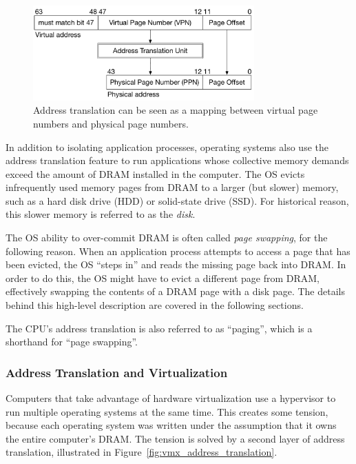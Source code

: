 \begin{figure}[hbt]
  \centering
  \includegraphics[width=85mm]{figures/address_translation_bits.pdf}
  \caption{
    Address translation can be seen as a mapping between virtual page numbers
    and physical page numbers.
  }
  \label{fig:address_translation_bits}
\end{figure}

In addition to isolating application processes, operating systems also use the
address translation feature to run applications whose collective memory
demands exceed the amount of DRAM installed in the computer. The OS evicts
infrequently used memory pages from DRAM to a larger (but slower) memory, such
as a hard disk drive (HDD) or solid-state drive (SSD). For historical reason,
this slower memory is referred to as the \textit{disk}.

The OS ability to over-commit DRAM is often called \textit{page swapping}, for
the following reason. When an application process attempts to access a page
that has been evicted, the OS ``steps in'' and reads the missing page back into
DRAM. In order to do this, the OS might have to evict a different page from
DRAM, effectively swapping the contents of a DRAM page with a disk page. The
details behind this high-level description are covered in the following
sections.

The CPU's address translation is also referred to as ``paging'', which is a
shorthand for ``page swapping''.


\subsubsection{Address Translation and Virtualization}
\label{sec:vmx_paging}


Computers that take advantage of hardware virtualization use a hypervisor to
run multiple operating systems at the same time. This creates some tension,
because each operating system was written under the assumption that it owns the
entire computer's DRAM. The tension is solved by a second layer of address
translation, illustrated in Figure~\ref{fig:vmx_address_translation}.

